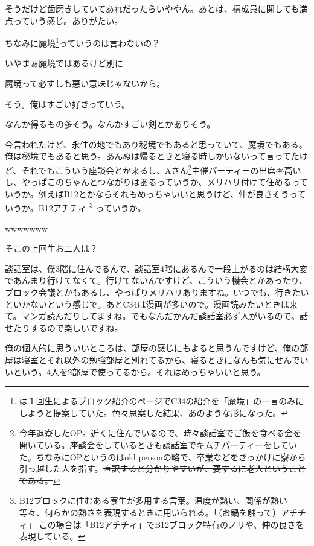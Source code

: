 \begin{multicols}{2}
  
そうだけど歯磨きしていてあれだったらいややん。あとは、構成員に関しても満点っていう感じ。ありがたい。

  
ちなみに魔境\footnote{は１回生によるブロック紹介のページでC34の紹介を「魔境」の一言のみにしようと提案していた。色々思案した結果、あのような形になった。}っていうのは言わないの？

  
いやまぁ魔境ではあるけど別に

  
魔境って必ずしも悪い意味じゃないから。

  
そう。俺はすごい好きっていう。

  
なんか得るもの多そう。なんかすごい剣とかありそう。

  
今言われたけど、永住の地でもあり秘境でもあると思っていて、魔境でもある。俺は秘境でもあると思う。あんぬは帰るときと寝る時しかいないって言ってたけど、それでもこういう座談会とか来るし、Aさん\footnote{今年退寮したOP。近くに住んでいるので、時々談話室でご飯を食べる会を開いている。座談会をしているときも談話室でキムチパーティーをしていた。ちなみにOPというのはold personの略で、卒業などをきっかけに寮から引っ越した人を指す。\sout{直訳すると分かりやすいが、要するに老人ということである。}}主催パーティーの出席率高いし、やっぱこのちゃんとつながりはあるっていうか、メリハリ付けて住めるっていうか。例えばB12とかならそれもめっちゃいいと思うけど、仲が良さそうっていうか。B12アチチィ \footnote {B12ブロックに住むある寮生が多用する言葉。温度が熱い、関係が熱い等々、何らかの熱さを表現するときに用いられる。「（お鍋を触って）アチチィ」 \newline この場合は「B12アチチィ」でB12ブロック特有のノリや、仲の良さを表現している。} っていうか。

  
wwwwwww

  
そこの上回生お二人は？

  
談話室は、僕3階に住んでるんで、談話室4階にあるんで一段上がるのは結構大変であんまり行けてなくて。行けてないんですけど、こういう機会とかあったり、ブロック会議とかもあるし、やっぱりメリハリありますね。いつでも、行きたいといかないという感じで。あとC34は漫画が多いので。漫画読みたいときは来て。マンガ読んだりしてますね。でもなんだかんだ談話室必ず人がいるので。話せたりするので楽しいですね。

  
俺の個人的に思ういいところは、部屋の感じにもよると思うんですけど、俺の部屋は寝室とそれ以外の勉強部屋と別れてるから、寝るときになんも気にせんでいいという。4人を2部屋で使ってるから。それはめっちゃいいと思う。


\end{multicols}
